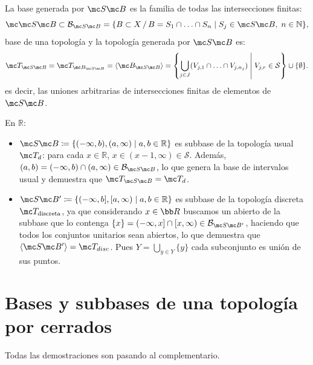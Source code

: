 La base generada por \(\mc S \mc B\) es la familia de todas las intersecciones finitas:
\[
    \mc \mc S \mc B\subset \mathcal{B}_{\mc S \mc B} = \{B\subset X \, / \, B=S_1 \cap \ldots \cap S_n \mid S_j \in \mc S \mc B, \; n \in \mathbb{N}\} \text{},
\]
base de una topolog\'ia y la topología generada por \(\mc S \mc B\) es:
\[
    \mc T_{\mc S \mc B}  = \mc T_{\mc B_{\mc S \mc B}} = \langle \mc B_{\mc S \mc B}\rangle = \left\{\bigcup_{j \in J} (V_{j, 1} \cap \ldots \cap V_{j, n_j}) \;\middle|\; V_{j, r} \in \mathcal{S}\right\} \cup \{\emptyset\} \text{}.
\] es decir, las uniones arbitrarias de intersecciones finitas de elementos de $\mc S \mc B$. 

\begin{ejem}
En \(\mathbb{R}\):
\begin{itemize}
    \item \(\mc S \mc B\coloneqq \{(-\infty, b), (a, \infty) \mid a, b \in \mathbb{R}\}\) es subbase de la topología usual \(\mc T_d\): para cada \(x \in \mathbb{R}\), \(x \in (x - 1, \infty) \in \mathcal{S}\). Además, \((a, b) = (-\infty, b) \cap (a, \infty) \in \mathcal{B}_{\mc S \mc B}\), lo que genera la base de intervalos usual y demuestra que \(\mc T_{\mc S \mc B} = \mc T_d\).
    \item \(\mc S \mc B' \coloneqq \{(-\infty, b], [a, \infty) \mid a, b \in \mathbb{R}\}\) es subbase de la topología discreta \(\mc T_{\text{discreta}}\), ya que considerando $x \in \bb R$ buscamos un abierto de la subbase que lo contenga \(\{x\} = (-\infty, x] \cap [x, \infty) \in \mathcal{B}_{\mc S \mc B'}\), haciendo que todos los conjuntos unitarios sean abiertos, lo que demuestra que $\langle \mc S\mc B' \rangle= \mc T_{disc}$. Pues $Y = \displaystyle \bigcup_{y\in Y} \{y\}$ cada subconjunto es uni\'on de sus puntos.
\end{itemize}
\end{ejem}

\section{Bases y subbases de una topolog\'ia por cerrados}
Todas las demostraciones son pasando al complementario.

